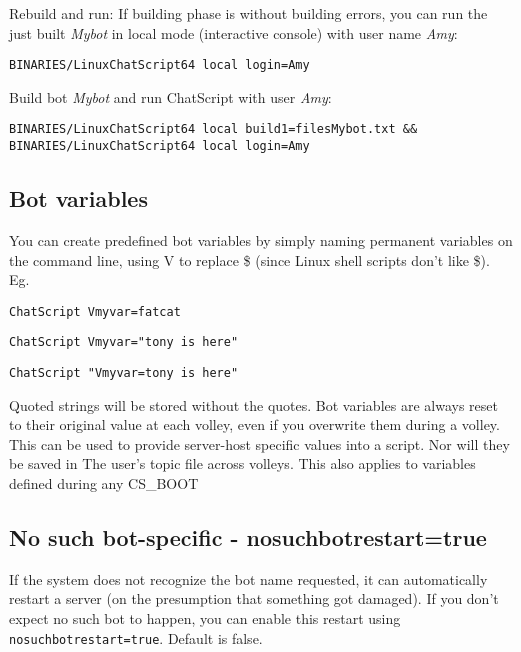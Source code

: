 \documentclass[]{article}
\begin{document}
Rebuild and run: If building phase is without building errors, you can
run the just built \emph{Mybot} in local mode (interactive console) with
user name \emph{Amy}:

\begin{verbatim}
BINARIES/LinuxChatScript64 local login=Amy
\end{verbatim}

Build bot \emph{Mybot} and run ChatScript with user \emph{Amy}:

\begin{verbatim}
BINARIES/LinuxChatScript64 local build1=filesMybot.txt &&  BINARIES/LinuxChatScript64 local login=Amy
\end{verbatim}

\subsection{Bot variables}\label{bot-variables}

You can create predefined bot variables by simply naming permanent
variables on the command line, using V to replace \$ (since Linux shell
scripts don't like \$). Eg.

\begin{verbatim}
ChatScript Vmyvar=fatcat
\end{verbatim}

\begin{verbatim}
ChatScript Vmyvar="tony is here"
\end{verbatim}

\begin{verbatim}
ChatScript "Vmyvar=tony is here"
\end{verbatim}

Quoted strings will be stored without the quotes. Bot variables are
always reset to their original value at each volley, even if you
overwrite them during a volley. This can be used to provide server-host
specific values into a script. Nor will they be saved in The user's
topic file across volleys. This also applies to variables defined during
any CS\_BOOT

\subsection{No such bot-specific -
nosuchbotrestart=true}\label{no-such-bot-specific---nosuchbotrestarttrue}

If the system does not recognize the bot name requested, it can
automatically restart a server (on the presumption that something got
damaged). If you don't expect no such bot to happen, you can enable this
restart using \texttt{nosuchbotrestart=true}. Default is false.
\end{document}
